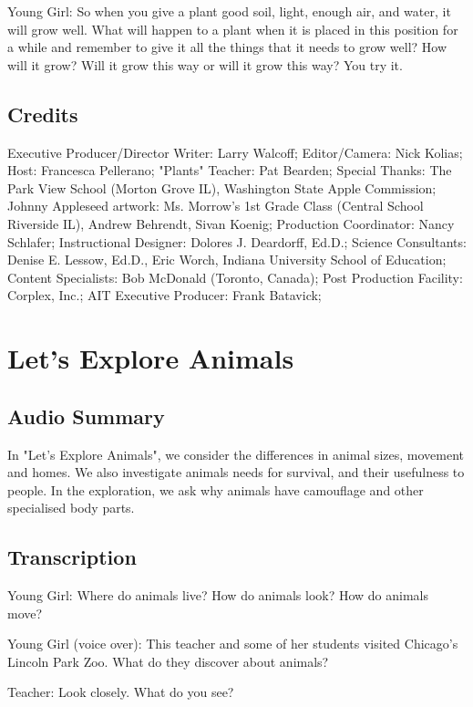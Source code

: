 Young Girl: So when you give a plant good soil, light, enough air, and water, it will grow well. What will happen to a plant when it is placed in this position for a while and remember to give it all the things that it needs to grow well? How will it grow? Will it grow this way or will it grow this way? You try it.

\subsection{Credits}

Executive Producer/Director Writer: Larry Walcoff;
Editor/Camera: Nick Kolias;
Host: Francesca Pellerano;
"Plants" Teacher: Pat Bearden;
Special Thanks: The Park View School (Morton Grove IL), Washington State Apple Commission;
Johnny Appleseed artwork: Ms. Morrow's 1st Grade Class (Central School Riverside IL), Andrew Behrendt, Sivan Koenig;
Production Coordinator: Nancy Schlafer;
Instructional Designer: Dolores J. Deardorff, Ed.D.;
Science Consultants: Denise E. Lessow, Ed.D., Eric Worch, Indiana University School of Education;
Content Specialists: Bob McDonald (Toronto, Canada);
Post Production Facility: Corplex, Inc.;
AIT Executive Producer: Frank Batavick;

\section{Let's Explore Animals}

\subsection{Audio Summary}

In "Let's Explore Animals", we consider the differences in animal sizes, movement and homes. We also investigate animals needs for survival, and their usefulness to people. In the exploration, we ask why animals have camouflage and other specialised body parts.

\subsection{Transcription}

Young Girl: Where do animals live? How do animals look? How do animals move?

Young Girl (voice over): This teacher and some of her students visited Chicago's Lincoln Park Zoo. What do they discover about animals?

Teacher: Look closely. What do you see?

